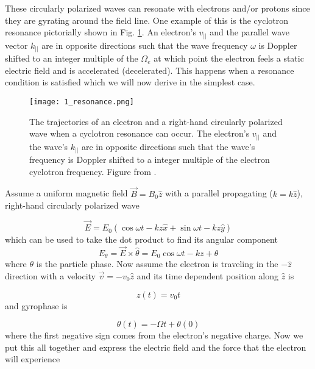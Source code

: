 These circularly polarized waves can resonate with electrons and/or protons since they are gyrating around the field line. One example of this is the cyclotron resonance pictorially shown in Fig. \ref{Intro:resonance}. An electron's $v_{||}$ and the parallel wave vector $k_{||}$ are in opposite directions such that the wave frequency $\omega$ is Doppler shifted to an integer multiple of the $\Omega_e$ at which point the electron feels a static electric field and is accelerated (decelerated). This happens when a resonance condition is satisfied which we will now derive in the simplest case.

\begin{figure}
\texttt{[image: 1\_resonance.png]}
\caption{The trajectories of an electron and a right-hand circularly polarized wave when a cyclotron resonance can occur. The electron's $v_{||}$ and the wave's $k_{||}$ are in opposite directions such that the wave's frequency is Doppler shifted to a integer multiple of the electron cyclotron frequency. Figure from \citep{Tsurutani1997}.}
\label{Intro:resonance}
\end{figure}

Assume a uniform magnetic field $\vec{B} = B_0 \hat{z}$ with a parallel propagating ($k = k\hat{z}$), right-hand circularly polarized wave

\begin{equation}
\vec{E} = E_0 (\cos{\omega t - kz}\hat{x} + \sin{\omega t - kz}\hat{y}) 
\end{equation} which can be used to take the dot product to find its angular component
\begin{equation}
E_\theta = \vec{E} \times \hat{\theta} = E_0 \cos{\omega t - kz + \theta}
\end{equation} where $\theta$ is the particle phase. Now assume the electron is traveling in the $-\hat{z}$ direction with a velocity $\vec{v} = -v_0 \hat{z}$ and its time dependent position along $\hat{z}$ is

\begin{equation}
z(t) = v_0 t
\end{equation} and gyrophase is

\begin{equation}
\theta(t) = -\Omega t + \theta(0)
\end{equation} where the first negative sign comes from the electron's negative charge. Now we put this all together and express the electric field and the force that the electron will experience

